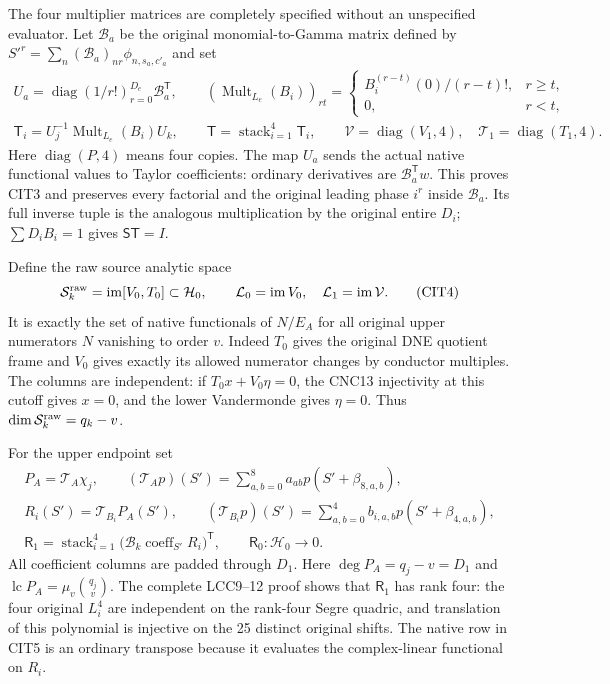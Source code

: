 \documentclass[10pt]{article}
\begin{document}
The four multiplier matrices are completely specified without an
unspecified evaluator. Let $\mathcal B_a$ be the original
monomial-to-Gamma matrix defined by
$S'^r=\sum_n(\mathcal B_a)_{nr}\phi_{n,s_a,c'_a}$ and set
\[
 \begin{gathered}
 U_a=\operatorname{diag}(1/r!)_{r=0}^{D_e}\mathcal B_a^{\mathsf T},
 \qquad
 (\operatorname{Mult}_{L_e}(B_i))_{rt}=
 \begin{cases}B_i^{(r-t)}(0)/(r-t)!,&r\ge t,\\0,&r<t,\end{cases}\\
 \mathsf T_i=U_j^{-1}\operatorname{Mult}_{L_e}(B_i)U_k,\qquad
 \mathsf T=\operatorname{stack}_{i=1}^4\mathsf T_i,\qquad
 \mathcal V=\operatorname{diag}(V_1,4),\quad
 \mathcal T_1=\operatorname{diag}(T_1,4).
 \end{gathered}\tag{CIT3}
\]
Here $\operatorname{diag}(P,4)$ means four copies. The map $U_a$
sends the actual native functional values to Taylor coefficients:
ordinary derivatives are $\mathcal B_a^{\mathsf T}w$.
This proves CIT3 and preserves every factorial and the original
leading phase $i^r$ inside $\mathcal B_a$. Its full inverse tuple
is the analogous multiplication by the original entire $D_i$;
$\sum D_iB_i=1$ gives $\mathsf S\mathsf T=I$.

Define the raw source analytic space
\[
 \mathcal S^{\rm raw}_k=\operatorname{im}[V_0,T_0]\subset\mathcal H_0,
 \qquad \mathcal L_0=\operatorname{im}V_0,\quad
 \mathcal L_1=\operatorname{im}\mathcal V .
 \tag{CIT4}
\]
It is exactly the set of native functionals of $N/E_A$ for all
original upper numerators $N$ vanishing to order $v$. Indeed
$T_0$ gives the original DNE quotient frame and $V_0$ gives exactly
its allowed numerator changes by conductor multiples. The columns
are independent: if $T_0x+V_0\eta=0$, the CNC13 injectivity
at this cutoff gives $x=0$, and the lower Vandermonde gives
$\eta=0$. Thus $\dim\mathcal S^{\rm raw}_k=q_k-v$.

For the upper endpoint set
\[
 \begin{gathered}
 P_A=\mathcal T_A\chi_j,\qquad
 (\mathcal T_Ap)(S')=\sum_{a,b=0}^8a_{ab}p(S'+\beta_{8,a,b}),\\
 R_i(S')=\mathcal T_{B_i}P_A(S'),\qquad
 (\mathcal T_{B_i}p)(S')=\sum_{a,b=0}^4b_{i,a,b}p(S'+\beta_{4,a,b}),\\
 \mathsf R_1=
   \operatorname{stack}_{i=1}^4
     \bigl(\mathcal B_k\operatorname{coeff}_{S'}R_i\bigr)^{\mathsf T},
 \qquad \mathsf R_0:\mathcal H_0\longrightarrow0 .
 \end{gathered}\tag{CIT5}
\]
All coefficient columns are padded through $D_1$.
Here $\deg P_A=q_j-v=D_1$ and
$\operatorname{lc}P_A=\mu_v\binom{q_j}{v}$. The complete LCC9--12
proof shows that $\mathsf R_1$ has rank four: the four original
$L_i^4$ are independent on the rank-four Segre quadric, and
translation of this polynomial is injective on the 25 distinct
original shifts. The native row in CIT5 is an ordinary transpose
because it evaluates the complex-linear functional on $R_i$.
\end{document}
